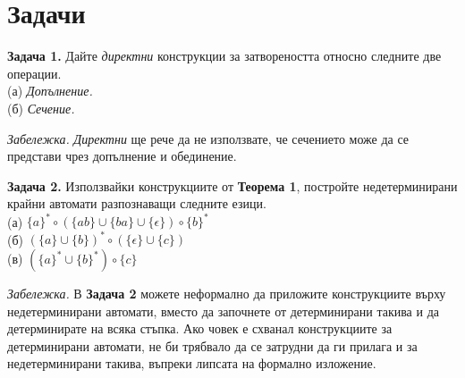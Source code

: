 \documentclass{article}
\begin{document}
\section{Задачи}
    \textbf{Задача 1.} Дайте \textit{директни} конструкции за затвореността относно
    следните две операции.\\
    (а) \textit{Допълнение.} \\
    (б) \textit{Сечение.} \\

    \vspace{10pt}

    \textit{Забележка.} \textit{Директни} ще рече да не използвате, че сечението може
    да се представи чрез допълнение и обединение.

    \vspace{15pt}

    \textbf{Задача 2.} Използвайки конструкциите от \textbf{Теорема 1}, постройте
    недетерминирани крайни автомати разпознаващи следните езици. \\
    (а) $\{a\}^*\circ(\{ab\}\cup\{ba\}\cup\{\epsilon\})\circ\{b\}^*$ \\
    (б) $(\{a\}\cup\{b\})^*\circ(\{\epsilon\}\cup\{c\})$ \\
    (в) $(\{a\}^*\cup\{b\}^*)\circ\{c\}$ 

    \vspace{20pt}

    \textit{Забележка.} В \textbf{Задача 2} можете неформално да приложите конструкциите върху 
    недетерминирани автомати, вместо да започнете от детерминирани такива и да 
    детерминирате на всяка стъпка. Ако човек е схванал конструкциите за детерминирани
    автомати, не би трябвало да се затрудни да ги прилага и за недетерминирани такива,
    въпреки липсата на формално изложение.

    \vspace{15pt}
\end{document}
